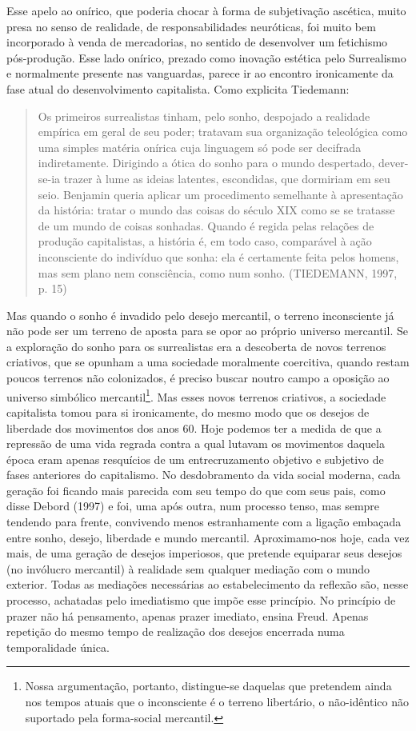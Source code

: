 Esse apelo ao onírico, que poderia chocar à forma de subjetivação
ascética, muito presa no senso de realidade, de responsabilidades
neuróticas, foi muito bem incorporado à venda de mercadorias, no sentido
de desenvolver um fetichismo pós-produção. Esse lado onírico, prezado
como inovação estética pelo Surrealismo e normalmente presente nas
vanguardas, parece ir ao encontro ironicamente da fase atual do
desenvolvimento capitalista. Como explicita Tiedemann:

\begin{quote}
Os primeiros surrealistas tinham, pelo sonho, despojado a realidade
empírica em geral de seu poder; tratavam sua organização teleológica
como uma simples matéria onírica cuja linguagem só pode ser decifrada
indiretamente. Dirigindo a ótica do sonho para o mundo despertado,
dever-se-ia trazer à lume as ideias latentes, escondidas, que dormiriam
em seu seio. Benjamin queria aplicar um procedimento semelhante à
apresentação da história: tratar o mundo das coisas do século XIX como
se se tratasse de um mundo de coisas sonhadas. Quando é regida pelas
relações de produção capitalistas, a história é, em todo caso,
comparável à ação inconsciente do indivíduo que sonha: ela é certamente
feita pelos homens, mas sem plano nem consciência, como num sonho.
(TIEDEMANN, 1997, p. 15)
\end{quote}

Mas quando o sonho é invadido pelo desejo mercantil, o terreno
inconsciente já não pode ser um terreno de aposta para se opor ao
próprio universo mercantil. Se a exploração do sonho para os
surrealistas era a descoberta de novos terrenos criativos, que se
opunham a uma sociedade moralmente coercitiva, quando restam poucos
terrenos não colonizados, é preciso buscar noutro campo a oposição ao
universo simbólico mercantil\footnote{Nossa argumentação, portanto,
  distingue-se daquelas que pretendem ainda nos tempos atuais que o
  inconsciente é o terreno libertário, o não-idêntico não suportado pela
  forma-social mercantil.}. Mas esses novos terrenos criativos, a
sociedade capitalista tomou para si ironicamente, do mesmo modo que os
desejos de liberdade dos movimentos dos anos 60. Hoje podemos ter a
medida de que a repressão de uma vida regrada contra a qual lutavam os
movimentos daquela época eram apenas resquícios de um entrecruzamento
objetivo e subjetivo de fases anteriores do capitalismo. No
desdobramento da vida social moderna, cada geração foi ficando mais
parecida com seu tempo do que com seus pais, como disse Debord (1997) e
foi, uma após outra, num processo tenso, mas sempre tendendo para
frente, convivendo menos estranhamente com a ligação embaçada entre
sonho, desejo, liberdade e mundo mercantil. Aproximamo-nos hoje, cada
vez mais, de uma geração de desejos imperiosos, que pretende equiparar
seus desejos (no invólucro mercantil) à realidade sem qualquer mediação
com o mundo exterior. Todas as mediações necessárias ao estabelecimento
da reflexão são, nesse processo, achatadas pelo imediatismo que impõe
esse princípio. No princípio de prazer não há pensamento, apenas prazer
imediato, ensina Freud. Apenas repetição do mesmo tempo de realização
dos desejos encerrada numa temporalidade única.

